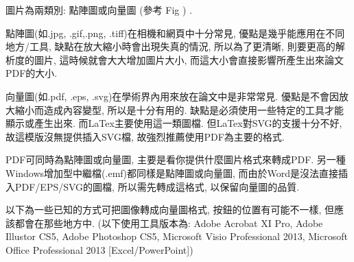 

圖片為兩類別: 點陣圖或向量圖 (參考 Fig ) .\\


點陣圖(如.jpg, .gif,.png, .tiff)在相機和網頁中十分常見, 優點是幾乎能應用在不同地方/工具, 缺點在放大縮小時會出現失真的情況, 所以為了更清晰, 則要更高的解析度的圖片, 這時候就會大大增加圖片大小, 而這大小會直接影響所產生出來論文PDF的大小.

向量圖(如.pdf, .eps, .svg)在學術界內用來放在論文中是非常常見. 優點是不會因放大縮小而造成內容變型, 所以是十分有用的. 缺點是必須使用一些特定的工具才能顯示或產生出來. 而LaTex主要使用這一類圖檔. 但LaTex對SVG的支援十分不好, 故這模版沒無提供插入SVG檔, 故強烈推薦使用PDF為主要的格式.

PDF可同時為點陣圖或向量圖, 主要是看你提供什麼圖片格式來轉成PDF. 另一種Windows增加型中繼檔(.emf)都同樣是點陣圖或向量圖, 而由於Word是沒法直接插入PDF/EPS/SVG的圖檔, 所以需先轉成這格式, 以保留向量圖的品質.

\newpage
{}

以下為一些已知的方式可把圖像轉成向量圖格式, 按鈕的位置有可能不一樣, 但應該都會在那些地方中. (以下使用工具版本為: Adobe Acrobat XI Pro, Adobe Illustor CS5, Adobe Photoshop CS5, Microsoft Visio Professional 2013, Microsoft Office Professional 2013 [Excel/PowerPoint])

